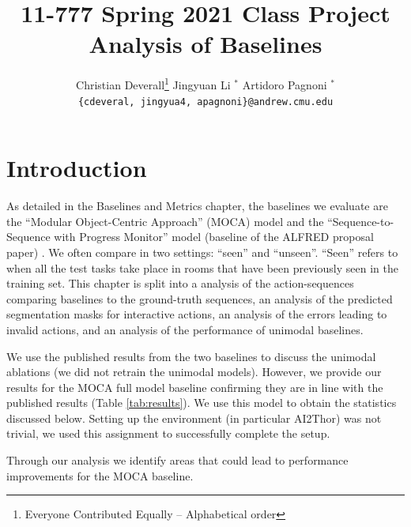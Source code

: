 \documentclass[11pt,a4paper]{article}
\title{11-777 Spring 2021 Class Project\\
Analysis of Baselines}
\author{
  Christian Deverall\thanks{\hspace{4pt}Everyone Contributed Equally -- Alphabetical order} \hspace{2em} Jingyuan Li $^*$ \hspace{2em} Artidoro Pagnoni $^*$ \\
  \texttt{\{cdeveral, jingyua4, apagnoni\}@andrew.cmu.edu}
  }
\date{}
\begin{document}
\maketitle


\section{Introduction}

As detailed in the Baselines and Metrics chapter, the baselines we evaluate are the ``Modular Object-Centric Approach'' (MOCA) \citep{singh2020moca} model and the ``Sequence-to-Sequence with Progress Monitor'' model (baseline of the ALFRED proposal paper) \citep{ALFRED20}. We often compare in two settings: ``seen'' and ``unseen''. ``Seen'' refers to when all the test tasks take place in rooms that have been previously seen in the training set. This chapter is split into a analysis of the action-sequences comparing baselines to the ground-truth sequences, an analysis of the predicted segmentation masks for interactive actions, an analysis of the errors leading to invalid actions, and an analysis of the performance of unimodal baselines. 

We use the published results from the two baselines to discuss the unimodal ablations (we did not retrain the unimodal models). However, we provide our results for the MOCA full model baseline confirming they are in line with the published results (Table \ref{tab:results}). We use this model to obtain the statistics discussed below. Setting up the environment (in particular AI2Thor) was not trivial, we used this assignment to successfully complete the setup.

Through our analysis we identify areas that could lead to performance improvements for the MOCA baseline.

    
\end{document}
